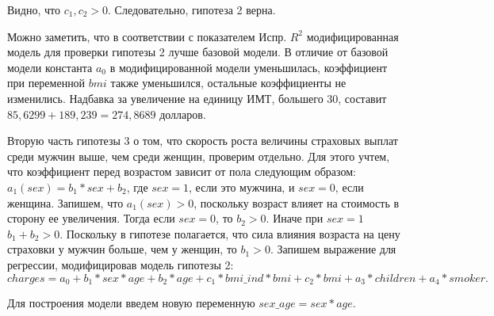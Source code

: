 \documentclass[a4paper,12pt]{article}
\begin{document}
Видно, что $c_1, c_2 >0$. Следовательно, гипотеза 2 верна.

Можно заметить, что в соответствии с показателем Испр. $R^2$ модифицированная модель для проверки гипотезы 2 лучше базовой модели. В отличие от базовой модели константа $a_0$ в модифицированной модели уменьшилась, коэффициент при переменной $bmi$ также уменьшился, остальные коэффициенты не изменились. Надбавка за увеличение на единицу ИМТ, большего 30, составит $85,6299 + 189,239 = 274,8689$ долларов.

Вторую часть гипотезы 3 о том, что скорость роста величины страховых выплат среди мужчин выше, чем среди женщин, проверим отдельно. Для этого учтем, что коэффициент перед возрастом зависит от пола следующим образом: $a_1(sex) = b_1 * sex + b_2$, где $sex = 1$, если это мужчина, и $sex = 0$, если женщина. Запишем, что $a_1(sex) > 0$, поскольку возраст влияет на стоимость в сторону ее увеличения. Тогда если $sex = 0$, то $b_2 > 0$. Иначе при $sex = 1$ $b_1 + b_2 > 0$. Поскольку в гипотезе полагается, что сила влияния возраста на цену страховки у мужчин больше, чем у женщин, то $b_1 > 0$. Запишем выражение для регрессии, модифицировав модель гипотезы 2:
\[charges = a_0 + b_1 * sex * age + b_2 * age + c_1 * bmi\_ind * bmi + c_2 * bmi + a_3 * children + a_4 * smoker.\]

Для построения модели введем новую переменную $sex\_age = sex * age$.
\end{document}
